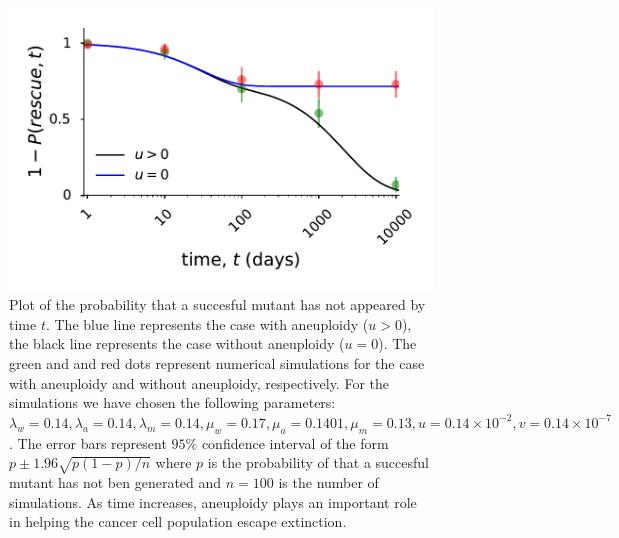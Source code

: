 \documentclass[12pt]{extarticle}
\begin{document}
\begin{figure}
\vspace*{1\baselineskip}
\includegraphics[width=1\textwidth]{Figures/ReboundProbability.pdf}
\caption{Plot of the probability that a succesful mutant has not appeared by time $t$. The blue line represents the case with aneuploidy ($u>0$), the black line represents the case without aneuploidy ($u=0$).  The green and and red dots represent numerical simulations for the case with aneuploidy and without aneuploidy, respectively.  For the simulations we have chosen the following parameters: $\lambda_w=0.14, \lambda_a=0.14,\lambda_m=0.14,\mu_w=0.17,\mu_a=0.1401,\mu_m=0.13, u=0.14\times10^{-2}, v=0.14\times10^{-7}$. The error bars represent $95\%$ confidence interval of the form $p\pm1.96\sqrt{p\left(1-p\right)/n}$ where $p$ is the  probability of that a succesful mutant has not ben generated and $n=100$ is the number of simulations. As time increases, aneuploidy plays an important role in helping the cancer cell population escape extinction.}
\label{ReboundProbability}
\end{figure}

%
\end{document}
